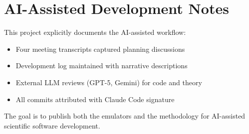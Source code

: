 \documentclass[11pt,a4paper]{article}
\begin{document}
\section{AI-Assisted Development Notes}

This project explicitly documents the AI-assisted workflow:
\begin{itemize}
    \item Four meeting transcripts captured planning discussions
    \item Development log maintained with narrative descriptions
    \item External LLM reviews (GPT-5, Gemini) for code and theory
    \item All commits attributed with Claude Code signature
\end{itemize}

The goal is to publish both the emulators and the methodology for AI-assisted scientific software development.
\end{document}

